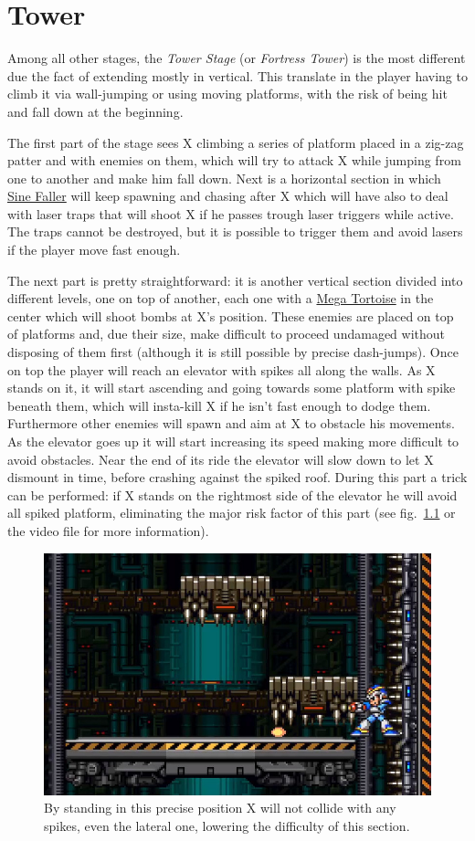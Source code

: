 \chapter{Tower}
Among all other stages, the \textit{Tower Stage} (or \textit{Fortress Tower}) is the most different due the fact of extending mostly in vertical. This translate in the player having to climb it via wall-jumping or using moving platforms, with the risk of being hit and fall down at the beginning.

The first part of the stage sees X climbing a series of platform placed in a zig-zag patter and with enemies on them, which will try to attack X while jumping from one to another and make him fall down. Next is a horizontal section in which \hyperlink{enem:Sine_Faller}{Sine Faller} will keep spawning and chasing after X which will have also to deal with laser traps that will shoot X if he passes trough laser triggers while active. The traps cannot be destroyed, but it is possible to trigger them and avoid lasers if the player move fast enough. 

The next part is pretty straightforward: it is another vertical section divided into different levels, one on top of another, each one with a \hyperlink{enem:Mega_Tortoise}{Mega Tortoise} in the center which will shoot bombs at X's position. These enemies are placed on top of platforms and, due their size, make difficult to proceed undamaged without disposing of them first (although it is still possible by precise dash-jumps). Once on top the player will reach an elevator with spikes all along the walls. As X stands on it, it will start ascending and going towards some platform with spike beneath them, which will insta-kill X if he isn't fast enough to dodge them. Furthermore other enemies will spawn and aim at X to obstacle his movements. As the elevator goes up it will start increasing its speed making more difficult to avoid obstacles. Near the end of its ride the elevator will slow down to let X dismount in time, before crashing against the spiked roof. During this part a trick can be performed: if X stands on the rightmost side of the elevator he will avoid all spiked platform, eliminating the major risk factor of this part (see fig.~\ref{tower_spike} or the video file  for more information). 
\begin{figure}[htp]
	\centering
	\includegraphics[width=0.5\linewidth]{figures/X1/Boomer_kuwanger/Tower_spike_skip.jpg}
	\caption{By standing in this precise position X will not collide with any spikes, even the lateral one, lowering the difficulty of this section.}
	\label{tower_spike}
\end{figure}


